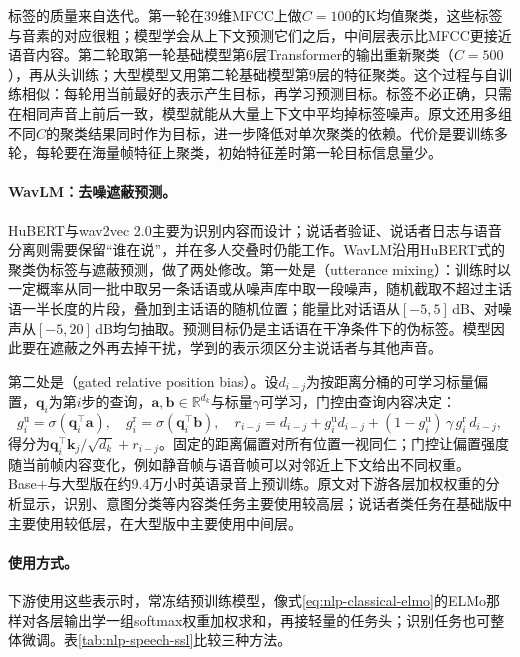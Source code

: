 标签的质量来自迭代。第一轮在39维MFCC上做$C=100$的K均值聚类，这些标签与音素的对应很粗；模型学会从上下文预测它们之后，中间层表示比MFCC更接近语音内容。第二轮取第一轮基础模型第6层Transformer的输出重新聚类（$C=500$），再从头训练；大型模型又用第二轮基础模型第9层的特征聚类。这个过程与自训练相似：每轮用当前最好的表示产生目标，再学习预测目标。标签不必正确，只需在相同声音上前后一致，模型就能从大量上下文中平均掉标签噪声。原文还用多组不同$C$的聚类结果同时作为目标，进一步降低对单次聚类的依赖。代价是要训练多轮，每轮要在海量帧特征上聚类，初始特征差时第一轮目标信息量少。

\paragraph{WavLM：去噪遮蔽预测。}HuBERT与wav2vec 2.0主要为识别内容而设计；说话者验证、说话者日志与语音分离则需要保留“谁在说”，并在多人交叠时仍能工作。WavLM沿用HuBERT式的聚类伪标签与遮蔽预测，做了两处修改。第一处是（utterance mixing）：训练时以一定概率从同一批中取另一条话语或从噪声库中取一段噪声，随机截取不超过主话语一半长度的片段，叠加到主话语的随机位置；能量比对话语从$[-5,5]$\,dB、对噪声从$[-5,20]$\,dB均匀抽取。预测目标仍是主话语在干净条件下的伪标签。模型因此要在遮蔽之外再去掉干扰，学到的表示须区分主说话者与其他声音。

第二处是（gated relative position bias）。设$d_{i-j}$为按距离分桶的可学习标量偏置，$\bm q_i$为第$i$步的查询，$\bm a,\bm b\in\mathbb R^{d_k}$与标量$\gamma$可学习，门控由查询内容决定：
\begin{equation}
 g^{\mathrm u}_i=\sigma(\bm q_i^{\top}\bm a),\quad
 g^{\mathrm r}_i=\sigma(\bm q_i^{\top}\bm b),\quad
 r_{i-j}=d_{i-j}+g^{\mathrm u}_i d_{i-j}+(1-g^{\mathrm u}_i)\,\gamma\,g^{\mathrm r}_i\,d_{i-j},
 \label{eq:nlp-speech-wavlm-gate}
\end{equation}
得分为$\bm q_i^{\top}\bm k_j/\sqrt{d_k}+r_{i-j}$。固定的距离偏置对所有位置一视同仁；门控让偏置强度随当前帧内容变化，例如静音帧与语音帧可以对邻近上下文给出不同权重。Base+与大型版在约9.4万小时英语录音上预训练。原文对下游各层加权权重的分析显示，识别、意图分类等内容类任务主要使用较高层；说话者类任务在基础版中主要使用较低层，在大型版中主要使用中间层。

\paragraph{使用方式。}下游使用这些表示时，常冻结预训练模型，像式\eqref{eq:nlp-classical-elmo}的ELMo那样对各层输出学一组softmax权重加权求和，再接轻量的任务头；识别任务也可整体微调。表\ref{tab:nlp-speech-ssl}比较三种方法。

